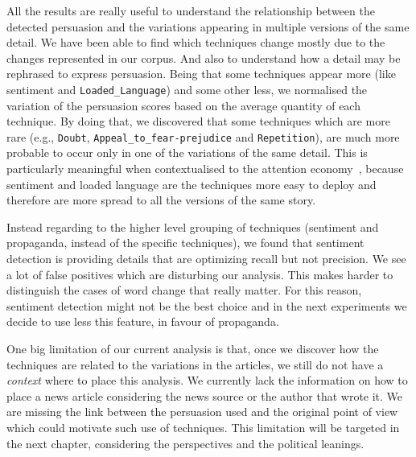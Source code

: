 All the results are really useful to understand the relationship between the detected persuasion and the variations appearing in multiple versions of the same detail.
We have been able to find which techniques change mostly due to the changes represented in our corpus. And also to understand how a detail may be rephrased to express persuasion.
Being that some techniques appear more (like 
 sentiment and \texttt{Loaded\_Language}) and some other less, we normalised the variation of the persuasion scores based on the average quantity of each technique.
 By doing that, we discovered that some techniques which are more rare (e.g., \texttt{Doubt}, \texttt{Appeal\_to\_fear-prejudice} and \texttt{Repetition}), are much more probable to occur only in one of the variations of the same detail.
This is particularly meaningful when contextualised to the attention economy~\citep{davenport2001attention}, because sentiment and loaded language are the techniques more easy to deploy and therefore are more spread to all the versions of the same story.

Instead regarding to the higher level grouping of techniques (sentiment and propaganda, instead of the specific techniques), we found that sentiment detection is providing details that are optimizing recall but not precision. We see a lot of false positives which are disturbing our analysis. This makes harder to distinguish the cases of word change that really matter. For this reason, sentiment detection might not be the best choice and in the next experiments we decide to use less this feature, in favour of propaganda.


One big limitation of our current analysis is that, once we discover how the techniques are related to the variations in the articles, we still do not have a \emph{context} where to place this analysis. We currently lack the information on how to place a news article considering the news source or the author that wrote it.
We are missing the link between the persuasion used and the original point of view which could motivate such use of techniques.
This limitation will be targeted in the next chapter, considering the perspectives and the political leanings.


